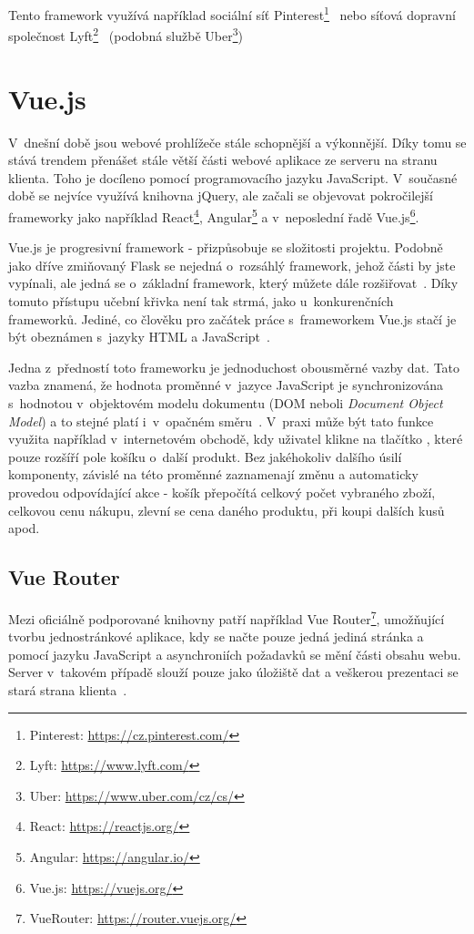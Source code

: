 Tento framework využívá například sociální síť Pinterest\footnote{Pinterest: \url{https://cz.pinterest.com/}}~\cite{bib:flask-pinterest}
nebo síťová dopravní společnost Lyft\footnote{Lyft: \url{https://www.lyft.com/}}~\cite{bib:flask-lyft} 
(podobná službě Uber\footnote{Uber: \url{https://www.uber.com/cz/cs/}})



\section{Vue.js}\label{section:Vue.js}
V~dnešní době jsou webové prohlížeče stále schopnější a výkonnější. Díky tomu se stává trendem přenášet stále větší části webové aplikace ze serveru na stranu klienta. Toho je docíleno pomocí programovacího jazyku JavaScript. V~současné době se nejvíce využívá knihovna jQuery, %
ale začali se objevovat pokročilejší frameworky jako například React\footnote{React: \url{https://reactjs.org/}}, Angular\footnote{Angular: \url{https://angular.io/}} a v~neposlední řadě Vue.js\footnote{Vue.js: \url{https://vuejs.org/}}.

Vue.js je progresivní framework - přizpůsobuje se složitosti projektu. Podobně jako dříve zmiňovaný Flask se nejedná o~rozsáhlý framework, jehož části by jste vypínali, ale jedná se o~základní framework, který můžete dále rozšiřovat~\cite{bib:vue-progressive}.
Díky tomuto přístupu učební křivka není tak strmá, jako u~konkurenčních frameworků. Jediné, co člověku pro začátek práce s~frameworkem Vue.js stačí je být obeznámen s~jazyky HTML a JavaScript~\cite{bib:vue-curve}.

Jedna z~předností toto frameworku je jednoduchost obousměrné vazby dat. Tato vazba znamená, že hodnota proměnné v~jazyce JavaScript je synchronizována s~hodnotou v~objektovém modelu dokumentu (DOM neboli \emph{Document Object Model}) a to stejné platí i~v~opačném směru~\cite{bib:vue-binding}.
V~praxi může být tato funkce využita například v~internetovém obchodě, kdy uživatel klikne na tlačítko , které pouze rozšíří pole košíku o~další produkt. Bez jakéhokoliv dalšího úsilí komponenty, závislé na této proměnné zaznamenají změnu a automaticky provedou odpovídající akce - košík přepočítá celkový počet vybraného zboží, celkovou cenu nákupu, zlevní se cena daného produktu, při koupi dalších kusů apod. 


\subsection{Vue Router}
Mezi oficiálně podporované knihovny patří například Vue Router\footnote{VueRouter: \url{https://router.vuejs.org/}}, umožňující tvorbu jednostránkové aplikace, kdy se načte pouze jedná jediná stránka a pomocí jazyku JavaScript a asynchroniích požadavků se mění části obsahu webu. Server v~takovém případě slouží pouze jako úložiště dat a veškerou prezentaci se stará strana klienta~\cite{bib:vue-router}. %


